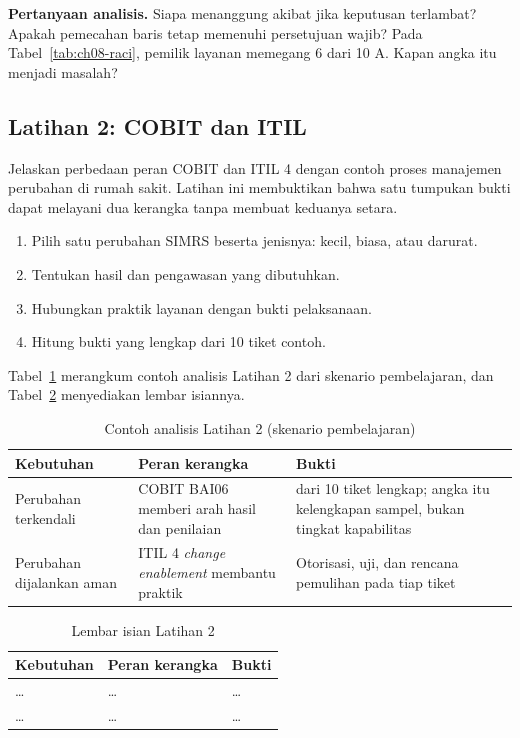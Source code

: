 \textbf{Pertanyaan analisis.} Siapa menanggung akibat jika keputusan terlambat? Apakah pemecahan
baris tetap memenuhi persetujuan wajib? Pada Tabel~\ref{tab:ch08-raci}, pemilik layanan memegang 6
dari 10 A. Kapan angka itu menjadi masalah?

\subsection*{Latihan 2: COBIT dan ITIL}

Jelaskan perbedaan peran COBIT dan ITIL 4 dengan contoh proses manajemen perubahan di rumah sakit.
Latihan ini membuktikan bahwa satu tumpukan bukti dapat melayani dua kerangka tanpa membuat
keduanya setara.

\begin{enumerate}
  \item Pilih satu perubahan SIMRS beserta jenisnya: kecil, biasa, atau darurat.
  \item Tentukan hasil dan pengawasan yang dibutuhkan.
  \item Hubungkan praktik layanan dengan bukti pelaksanaan.
  \item Hitung bukti yang lengkap dari 10 tiket contoh.
\end{enumerate}

Tabel~\ref{tab:ch08-lat2-contoh} merangkum contoh analisis Latihan 2 dari skenario pembelajaran,
dan Tabel~\ref{tab:ch08-lat2-hasil} menyediakan lembar isiannya.

\begin{table}[!htb]
  \centering\small
  \caption{Contoh analisis Latihan 2 (skenario pembelajaran)}\label{tab:ch08-lat2-contoh}
  \begin{tabularx}{\textwidth}{|>{\raggedright\arraybackslash}X|>{\raggedright\arraybackslash}X|>{\raggedright\arraybackslash}X|}
    \hline
    \textbf{Kebutuhan} & \textbf{Peran kerangka} & \textbf{Bukti} \\ \hline
    Perubahan terkendali & COBIT BAI06 memberi arah hasil dan penilaian & 8 dari 10 tiket lengkap;
    angka itu kelengkapan sampel, bukan tingkat kapabilitas \\ \hline
    Perubahan dijalankan aman & ITIL 4 \textit{change enablement} membantu praktik & Otorisasi, uji,
    dan rencana pemulihan pada tiap tiket \\ \hline
  \end{tabularx}
\end{table}

\begin{table}[!htb]
  \centering\small
  \caption{Lembar isian Latihan 2}\label{tab:ch08-lat2-hasil}
  \begin{tabularx}{\textwidth}{|>{\raggedright\arraybackslash}X|>{\raggedright\arraybackslash}X|>{\raggedright\arraybackslash}X|}
    \hline
    \textbf{Kebutuhan} & \textbf{Peran kerangka} & \textbf{Bukti} \\ \hline
    \dots & \dots & \dots \\ \hline
    \dots & \dots & \dots \\ \hline
  \end{tabularx}
\end{table}

